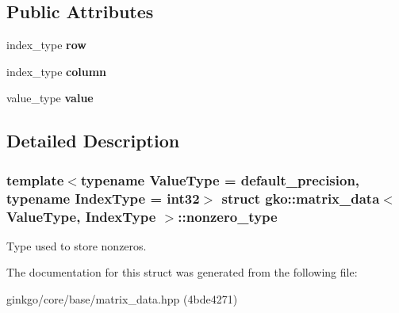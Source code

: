 \subsection*{Public Attributes}
\begin{DoxyCompactItemize}
\item 
\mbox{\label{structgko_1_1matrix__data_1_1nonzero__type_ac7c1c9c42f21f5e0c4fc19c152c1e264}} 
index\+\_\+type {\bfseries row}
\item 
\mbox{\label{structgko_1_1matrix__data_1_1nonzero__type_a29ce7fe74a417539fc3bde39507c113f}} 
index\+\_\+type {\bfseries column}
\item 
\mbox{\label{structgko_1_1matrix__data_1_1nonzero__type_ab806f40e68357159abc75dec2af18a9d}} 
value\+\_\+type {\bfseries value}
\end{DoxyCompactItemize}


\subsection{Detailed Description}
\subsubsection*{template$<$typename Value\+Type = default\+\_\+precision, typename Index\+Type = int32$>$\newline
struct gko\+::matrix\+\_\+data$<$ Value\+Type, Index\+Type $>$\+::nonzero\+\_\+type}

Type used to store nonzeros. 

The documentation for this struct was generated from the following file\+:\begin{DoxyCompactItemize}
\item 
ginkgo/core/base/matrix\+\_\+data.\+hpp (4bde4271)\end{DoxyCompactItemize}
